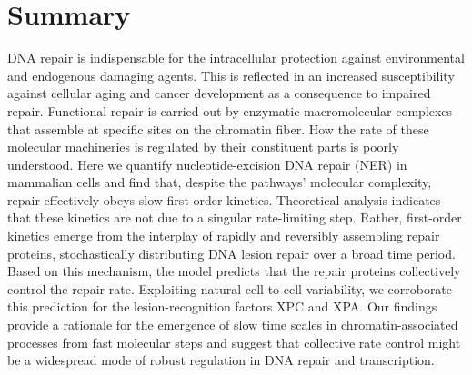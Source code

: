 \chapter*{Summary}


DNA repair is indispensable for the intracellular protection against environmental and endogenous damaging agents. This is reflected in an increased susceptibility against cellular aging and cancer development as a consequence to impaired repair. Functional repair is carried out by enzymatic macromolecular complexes that assemble at specific sites on the chromatin fiber. How the rate of these molecular machineries is regulated by their constituent parts is poorly understood. 
Here we quantify nucleotide-excision DNA repair (NER) in mammalian cells and find that, despite the pathways' molecular complexity, repair effectively obeys slow first-order kinetics. Theoretical analysis indicates that these kinetics are not due to a singular rate-limiting step. Rather, first-order kinetics emerge from the interplay of rapidly and reversibly assembling repair proteins, stochastically distributing DNA lesion repair over a broad time period. Based on this mechanism, the model predicts that the repair proteins collectively control the repair rate. Exploiting natural cell-to-cell variability, we corroborate this prediction for the lesion-recognition factors XPC and XPA. 
Our findings provide a rationale for the emergence of slow time scales in chromatin-associated processes from fast molecular steps and suggest that collective rate control might be a widespread mode of robust regulation in DNA repair and transcription.



%